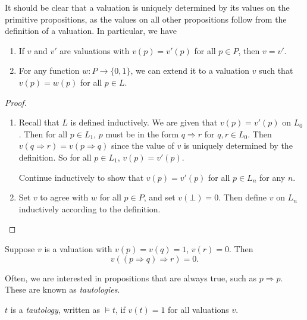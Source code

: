 \documentclass[a4paper]{article}
\begin{document}
It should be clear that a valuation is uniquely determined by its values on the primitive propositions, as the values on all other propositions follow from the definition of a valuation. In particular, we have
\begin{prop}\leavevmode
  \begin{enumerate}
    \item If $v$ and $v'$ are valuations with $v(p) = v'(p)$ for all $p\in P$, then $v = v'$.
    \item For any function $w: P \to \{0, 1\}$, we can extend it to a valuation $v$ such that $v(p) = w(p)$ for all $p\in L$.
  \end{enumerate}
\end{prop}

\begin{proof}\leavevmode
  \begin{enumerate}
    \item Recall that $L$ is defined inductively. We are given that $v(p) = v'(p)$ on $L_0$. Then for all $p\in L_1$, $p$ must be in the form $q\Rightarrow r$ for $q, r\in L_0$. Then $v(q\Rightarrow r) = v(p\Rightarrow q)$ since the value of $v$ is uniquely determined by the definition. So for all $p\in L_1$, $v(p) = v'(p)$.

      Continue inductively to show that $v(p) = v'(p)$ for all $p\in L_n$ for any $n$.

    \item Set $v$ to agree with $w$ for all $p\in P$, and set $v(\bot) = 0$. Then define $v$ on $L_n$ inductively according to the definition.\qedhere
  \end{enumerate}
\end{proof}

\begin{eg}
  Suppose $v$ is a valuation with $v(p) = v(q) = 1$, $v(r) = 0$. Then
  \[
    v((p\Rightarrow q)\Rightarrow r) = 0.
  \]
\end{eg}

Often, we are interested in propositions that are always true, such as $p \Rightarrow p$. These are known as \emph{tautologies}.
\begin{defi}[Tautology]
  $t$ is a \emph{tautology}, written as $\models t$, if $v(t) = 1$ for all valuations $v$.
\end{defi}
\end{document}
